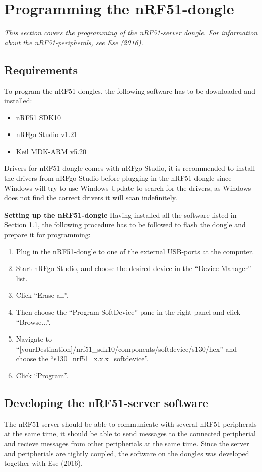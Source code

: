 \section{Programming the nRF51-dongle}
\textit{This section covers the programming of the nRF51-server dongle. For information about the nRF51-peripherals, see Ese (2016).}

\subsection{Requirements}
\label{sec:nrfrequirements}
To program the nRF51-dongles, the following software has to be downloaded and installed:
\begin{itemize}
	\item nRF51 SDK10\cite{nrf51sdk}
	\item nRFgo Studio v1.21\cite{nrfgo}
	\item Keil MDK-ARM v5.20\cite{keil}
\end{itemize}
Drivers for nRF51-dongle comes with nRFgo Studio, it is recommended to install the drivers from nRFgo Studio before plugging in the nRF51 dongle since Windows will try to use Windows Update to search for the drivers, as Windows does not find the correct drivers it will scan indefinitely.

\textbf{Setting up the nRF51-dongle}
Having installed all the software listed in Section \ref{sec:nrfrequirements}, the following procedure has to be followed to flash the dongle and prepare it for programming:
\begin{enumerate}
	\item Plug in the nRF51-dongle to one of the external USB-ports at the computer.
	\item Start nRFgo Studio, and choose the desired device in the ``Device Manager''-list.
	\item Click ``Erase all''.
	\item Then choose the ``Program SoftDevice''-pane in the right panel and click ``Browse...''.
	\item Navigate to ``[yourDestination]/nrf51\_sdk10/components/softdevice/s130/hex'' and choose the ``s130\_nrf51\_x.x.x\_softdevice''.
	\item Click ``Program''.
\end{enumerate}

\subsection{Developing the nRF51-server software}
The nRF51-server should be able to communicate with several nRF51-peripherals at the same time, it should be able to send messages to the connected peripherial and recieve messages from other peripherials at the same time. Since the server and peripherials are tightly coupled, the software on the dongles was developed together with Ese (2016).

